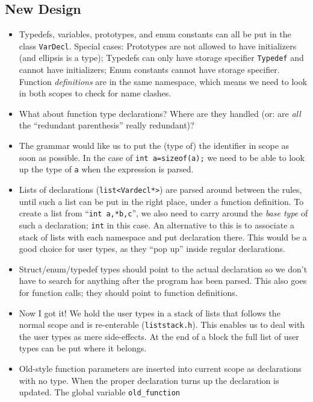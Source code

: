 \begin{docpart}
\subsection{New Design}
\begin{itemize}
\item Typedefs, variables, prototypes, and enum constants can all be
  put in the class \texttt{VarDecl}. Special cases: Prototypes are
  not allowed to have initializers (and ellipsis is a type); Typedefs
  can only have storage specifier \texttt{Typedef} and cannot have
  initializers; Enum constants cannot have storage specifier.
  Function \emph{definitions} are in the same namespace, which means
  we need to look in both scopes to check for name clashes.
\item What about function type declarations? Where are they handled
  (or: are \emph{all} the ``redundant parenthesis'' really redundant)?
\item The grammar would like us to put the (type of) the identifier in
  scope as soon as possible. In the case of \eg \texttt{int
    a=sizeof(a);} we need to be able to look up the type of \texttt{a}
  when the expression is parsed.
\item Lists of declarations (\texttt{list<Vardecl*>}) are parsed
  around between the rules, until such a list can be put in the right
  place, \eg under a function definition. To create a list from \eg
  ``\texttt{int a,*b,c}'', we also need to carry around the \emph{base
    type} of such a declaration; \texttt{int} in this case. An
  alternative to this is to associate a stack of lists with each
  namespace and put declaration there. This would be a good choice for
  user types, as they ``pop up'' inside regular declarations.
\item Struct/enum/typedef types should point to the actual declaration
  so we don't have to search for anything after the program has been
  parsed. This also goes for function calls; they should point to
  function definitions.
\item Now I got it! We hold the user types in a stack of lists that
  follows the normal scope and is re-enterable (\texttt{liststack.h}).
  This enables us to deal with the user types as mere side-effects. At
  the end of a block the full list of user types can be put where it
  belongs. 
\item Old-style function parameters are inserted into current scope as
  declarations with no type. When the proper declaration turns up the
  declaration is updated. The global variable \texttt{old\_function}

\end{itemize}
\end{docpart}
